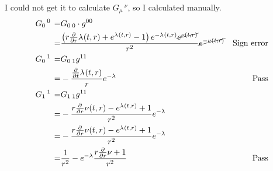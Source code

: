 \documentclass[]{article}
\begin{document}
I could not get it to calculate ${G}{}_{\mu}\,{}^{\nu}$, so I calculated manually.
\begin{align*}
	{G}{}_{0}\,{}^{0}\, =& {G}{}_{0}\,{}_{0} \cdot  g^{00}\\
	=& \frac{\left(r \frac{\partial}{\partial r} \lambda_{}{\left(t,r \right)} + e^{\lambda_{}{\left(t,r \right)}} - 1\right) e^{- \lambda_{}{\left(t,r \right)}} \cancel{e^{\nu{\left(t,r \right)}}}}{r^{2}} \cancel{e^{-\nu{\left(t,r \right)}}} & \text{Sign error}\\
	{G}{}_{0}\,{}^{1}\, =& {G}{}_{0}\,{}_{1} g^{11} \\
	=&-\frac{\frac{\partial}{\partial t} \lambda_{}{\left(t,r \right)}}{r} e^{-\lambda} &\text{Pass}\\
	{G}{}_{1}\,{}^{1}\, =& {G}{}_{1}\,{}_{1} g^{11}\\
	=&- \frac{r \frac{\partial}{\partial r} \nu{\left(t,r \right)} - e^{\lambda_{}{\left(t,r \right)}} + 1}{r^{2}} e^{-\lambda}\\
	=&- \frac{r \frac{\partial}{\partial r} \nu{\left(t,r \right)} - e^{\lambda_{}{\left(t,r \right)}} + 1}{r^{2}} e^{-\lambda}\\
	=&\frac{1}{r^2} -e^{-\lambda}\frac{r \frac{\partial}{\partial r} \nu +1}{r^2}  &\text{Pass}
\end{align*}


\raggedright

\end{document}
